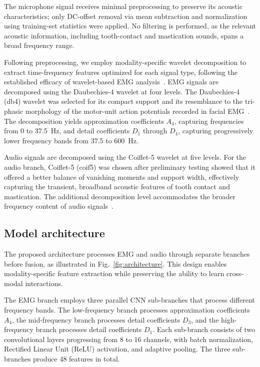 \documentclass[pdflatex,sn-nature,iicol]{sn-jnl}
\begin{document}
The microphone signal receives minimal preprocessing to preserve its acoustic characteristics; only DC-offset removal via mean subtraction and normalization using training-set statistics were applied. No filtering is performed, as the relevant acoustic information, including tooth-contact and mastication sounds, spans a broad frequency range.

Following preprocessing, we employ modality-specific wavelet decomposition to extract time-frequency features optimized for each signal type, following the established efficacy of wavelet-based EMG analysis~\cite{phinyomark2012feature}. EMG signals are decomposed using the Daubechies-4 wavelet at four levels. The Daubechies-4 (db4) wavelet was selected for its compact support and its resemblance to the tri-phasic morphology of the motor-unit action potentials recorded in facial EMG~\cite{englehart2003robust}. The decomposition yields approximation coefficients $A_4$, capturing frequencies from 0 to 37.5~Hz, and detail coefficients $D_1$ through $D_4$, capturing progressively lower frequency bands from 37.5 to 600~Hz.

Audio signals are decomposed using the Coiflet-5 wavelet at five levels. For the audio branch, Coiflet-5 (coif5) was chosen after preliminary testing showed that it offered a better balance of vanishing moments and support width, effectively capturing the transient, broadband acoustic features of tooth contact and mastication. The additional decomposition level accommodates the broader frequency content of audio signals~\cite{bharathi2025unveiling}.

\subsection{Model architecture}

The proposed architecture processes EMG and audio through separate branches before fusion, as illustrated in Fig.~\ref{fig:architecture}. This design enables modality-specific feature extraction while preserving the ability to learn cross-modal interactions.

The EMG branch employs three parallel CNN sub-branches that process different frequency bands. The low-frequency branch processes approximation coefficients $A_4$, the mid-frequency branch processes detail coefficients $D_3$, and the high-frequency branch processes detail coefficients $D_1$. Each sub-branch consists of two convolutional layers progressing from 8 to 16 channels, with batch normalization, Rectified Linear Unit (ReLU) activation, and adaptive pooling. The three sub-branches produce 48 features in total.
\end{document}
